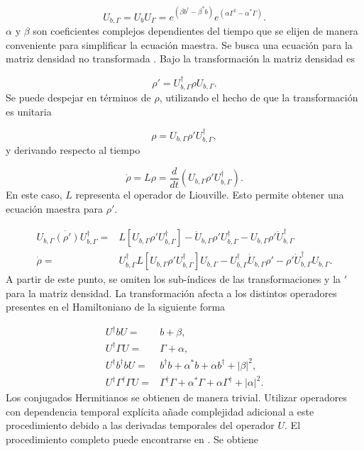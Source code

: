 \documentclass[10pt,a4paper]{report}
\begin{document}
\begin{equation}
U_{b,\Gamma} =  U_b U_\Gamma = e^{(\beta b^\dagger - \beta^* b)}e^{(\alpha\Gamma^\dagger - \alpha^* \Gamma)}.
\end{equation} $\alpha$ y $\beta$ son coeficientes complejos dependientes del tiempo que se elijen de manera conveniente para simplificar la ecuación maestra. Se busca una ecuación para la matriz densidad no transformada \cite{TesisMaestria}. Bajo la transformación la matriz densidad es

\begin{equation}
\rho' = U_{b,\Gamma}^\dagger \rho U_{b,\Gamma}.
\end{equation} Se puede despejar en términos de $\rho$, utilizando el hecho de que la transformación es unitaria

\begin{equation}
\rho = U_{b,\Gamma} \rho' U_{b,\Gamma}^\dagger,
\end{equation}y derivando respecto al tiempo

\begin{equation}
\dot{\rho} = L\rho = \frac{d}{dt}(U_{b,\Gamma} \rho' U_{b,\Gamma}^\dagger).
\end{equation} En este caso, $L$ representa el operador de Liouville. Esto permite obtener una ecuación maestra para $\rho'$. 

\begin{align}
 U_{b,\Gamma} \dot{(\rho')} U_{b,\Gamma}^\dagger =& L[U_{b,\Gamma} \rho' U_{b,\Gamma}^\dagger] - \dot{U}_{b,\Gamma}\rho'U_{b,\Gamma}^\dagger -U_{b,\Gamma} \rho' \dot{U}_{b,\Gamma}^\dagger\\
\dot{\rho} =& U_{b,\Gamma}^\dagger L[U_{b,\Gamma} \rho' U_{b,\Gamma}^\dagger]U_{b,\Gamma}-U_{b,\Gamma}^\dagger\dot{U}_{b,\Gamma}\rho'-\rho'\dot{U}_{b,\Gamma}^\dagger U_{b,\Gamma}.
\end{align} A partir de este punto, se omiten los sub-índices de las transformaciones y la $'$ para la matriz densidad. La transformación afecta a los distintos operadores presentes en el Hamiltoniano de la siguiente forma

\begin{align}
U^\dagger b U =& b + \beta,\\
U^\dagger \Gamma U =& \Gamma + \alpha,\\
U^\dagger b^\dagger b U =& b^\dagger b + \alpha^* b + \alpha b^\dagger +|\beta|^2,\\
U^\dagger \Gamma^\dagger \Gamma U =& \Gamma^\dagger \Gamma + \alpha^* \Gamma + \alpha \Gamma^\dagger +|\alpha|^2.
\end{align} Los conjugados Hermitianos se obtienen de manera trivial. Utilizar operadores con dependencia temporal explícita añade complejidad adicional a este procedimiento debido a las derivadas temporales del operador $U$. El procedimiento completo puede encontrarse en \cite{TesisMaestria}. Se obtiene
\end{document}
